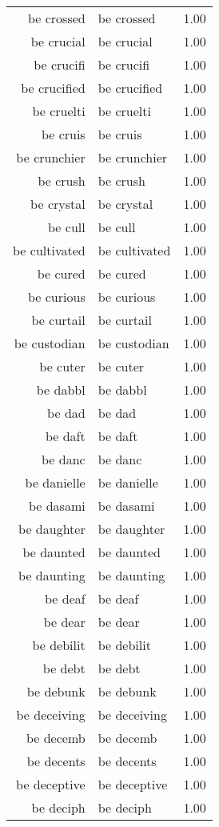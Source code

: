 \begin{table}[ht]
\begin{tabular}{rlr}
  be crossed & be crossed & 1.00 \\ 
  be crucial & be crucial & 1.00 \\ 
  be crucifi & be crucifi & 1.00 \\ 
  be crucified & be crucified & 1.00 \\ 
  be cruelti & be cruelti & 1.00 \\ 
  be cruis & be cruis & 1.00 \\ 
  be crunchier & be crunchier & 1.00 \\ 
  be crush & be crush & 1.00 \\ 
  be crystal & be crystal & 1.00 \\ 
  be cull & be cull & 1.00 \\ 
  be cultivated & be cultivated & 1.00 \\ 
  be cured & be cured & 1.00 \\ 
  be curious & be curious & 1.00 \\ 
  be curtail & be curtail & 1.00 \\ 
  be custodian & be custodian & 1.00 \\ 
  be cuter & be cuter & 1.00 \\ 
  be dabbl & be dabbl & 1.00 \\ 
  be dad & be dad & 1.00 \\ 
  be daft & be daft & 1.00 \\ 
  be danc & be danc & 1.00 \\ 
  be danielle & be danielle & 1.00 \\ 
  be dasami & be dasami & 1.00 \\ 
  be daughter & be daughter & 1.00 \\ 
  be daunted & be daunted & 1.00 \\ 
  be daunting & be daunting & 1.00 \\ 
  be deaf & be deaf & 1.00 \\ 
  be dear & be dear & 1.00 \\ 
  be debilit & be debilit & 1.00 \\ 
  be debt & be debt & 1.00 \\ 
  be debunk & be debunk & 1.00 \\ 
  be deceiving & be deceiving & 1.00 \\ 
  be decemb & be decemb & 1.00 \\ 
  be decents & be decents & 1.00 \\ 
  be deceptive & be deceptive & 1.00 \\ 
  be deciph & be deciph & 1.00 \\ 

\end{tabular}
\end{table}
